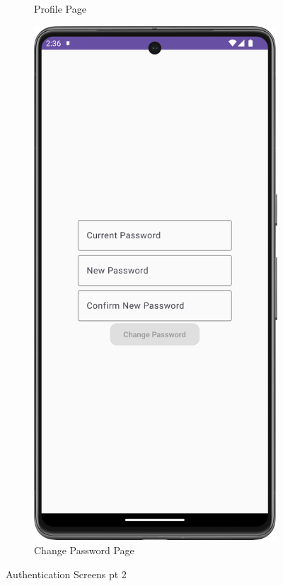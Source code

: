\begin{figure}[H]
\begin{subfigure}[b]{0.3\textwidth}
    \caption{Profile Page}
    \label{fig:profile}
  \end{subfigure}
  \hfill
  \begin{subfigure}[b]{0.3\textwidth}
    \includegraphics[width=\textwidth]{Figures/Product_Images/Auth/change_password.png}
    \caption{Change Password Page}
    \label{fig:change_password}
  \end{subfigure}
  \caption{Authentication Screens pt 2}
  \label{fig:Authentication_screens_2}
\end{figure}

